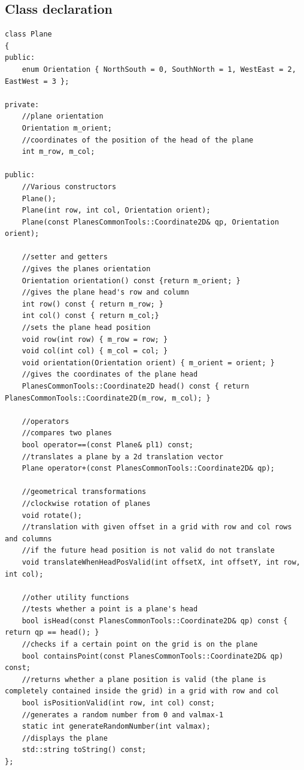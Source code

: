 \subsection{Class declaration}
\begin{lstlisting}[caption = {Plane Class Declaration},label=plane_declaration]
class Plane
{
public:
    enum Orientation { NorthSouth = 0, SouthNorth = 1, WestEast = 2, EastWest = 3 };

private:
    //plane orientation
    Orientation m_orient;
    //coordinates of the position of the head of the plane
    int m_row, m_col;

public:
    //Various constructors
    Plane();
    Plane(int row, int col, Orientation orient);
    Plane(const PlanesCommonTools::Coordinate2D& qp, Orientation orient);

    //setter and getters
    //gives the planes orientation
    Orientation orientation() const {return m_orient; }
    //gives the plane head's row and column
    int row() const { return m_row; }
    int col() const { return m_col;}
    //sets the plane head position
    void row(int row) { m_row = row; }
    void col(int col) { m_col = col; }
    void orientation(Orientation orient) { m_orient = orient; }
    //gives the coordinates of the plane head
    PlanesCommonTools::Coordinate2D head() const { return PlanesCommonTools::Coordinate2D(m_row, m_col); }

    //operators
    //compares two planes
    bool operator==(const Plane& pl1) const;
    //translates a plane by a 2d translation vector
    Plane operator+(const PlanesCommonTools::Coordinate2D& qp);

    //geometrical transformations
    //clockwise rotation of planes
    void rotate();
    //translation with given offset in a grid with row and col rows and columns
    //if the future head position is not valid do not translate
    void translateWhenHeadPosValid(int offsetX, int offsetY, int row, int col);

    //other utility functions
    //tests whether a point is a plane's head
    bool isHead(const PlanesCommonTools::Coordinate2D& qp) const { return qp == head(); }
    //checks if a certain point on the grid is on the plane
    bool containsPoint(const PlanesCommonTools::Coordinate2D& qp) const;
    //returns whether a plane position is valid (the plane is completely contained inside the grid) in a grid with row and col
    bool isPositionValid(int row, int col) const;
    //generates a random number from 0 and valmax-1
    static int generateRandomNumber(int valmax);
    //displays the plane
    std::string toString() const;
};
\end{lstlisting} 

